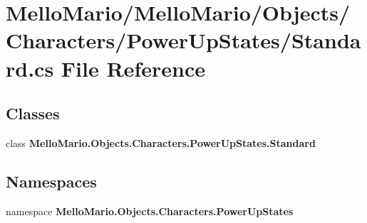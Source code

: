 \section{Mello\+Mario/\+Mello\+Mario/\+Objects/\+Characters/\+Power\+Up\+States/\+Standard.cs File Reference}
\label{Standard_8cs}
\subsection*{Classes}
\begin{DoxyCompactItemize}
\item 
class \textbf{ Mello\+Mario.\+Objects.\+Characters.\+Power\+Up\+States.\+Standard}
\end{DoxyCompactItemize}
\subsection*{Namespaces}
\begin{DoxyCompactItemize}
\item 
namespace \textbf{ Mello\+Mario.\+Objects.\+Characters.\+Power\+Up\+States}
\end{DoxyCompactItemize}
